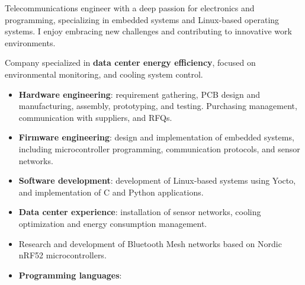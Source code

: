 \documentclass[10pt,a4paper,ragged2e,withhyper]{altacv}
\begin{document}
\begin{paracol}{2}


Telecommunications engineer with a deep passion for electronics and programming, specializing in embedded systems and Linux-based operating systems. I enjoy embracing new challenges and contributing to innovative work environments.



Company specialized in \textbf{data center energy efficiency}, focused on environmental monitoring, and cooling system control.

\begin{itemize}
    \item \textbf{Hardware engineering}: requirement gathering, PCB design and manufacturing, assembly, prototyping, and testing. Purchasing management, communication with suppliers, and RFQs.
    \item \textbf{Firmware engineering}: design and implementation of embedded systems, including microcontroller programming, communication protocols, and sensor networks.
    \item \textbf{Software development}: development of Linux-based systems using Yocto, and implementation of C and Python applications.
    \item \textbf{Data center experience}: installation of sensor networks, cooling optimization and energy consumption management.
\end{itemize}

\divider

\begin{itemize}
    \item Research and development of Bluetooth Mesh networks based on Nordic nRF52 microcontrollers.
\end{itemize}


\begin{itemize}
  \item \textbf{Programming languages}:
  
  \smallskip
     
  

\end{itemize}
\end{paracol}
\end{document}
